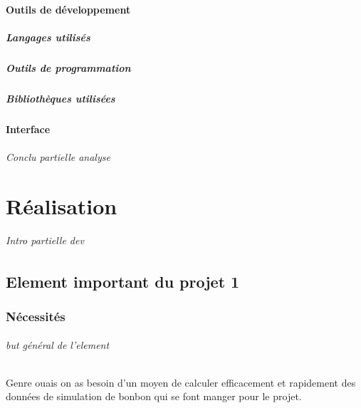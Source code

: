 \documentclass[
	headsepline=on,
	footsepline=on,
	twoside=off,
	abstract=on,
	DIV=10
]{scrreprt}
\begin{document}
			\subsection{Outils de développement}
			
				\subsubsection{Langages utilisés}
				
				\subsubsection{Outils de programmation}
				
				\subsubsection{Bibliothèques utilisées}
				
			\subsection{Interface}
		
		\paragraph{Conclu partielle analyse}
			
	\part{Réalisation}
	
		\paragraph{Intro partielle dev}
		\chapter{Element important du projet 1}
		
			\section{Nécessités}
			
				\paragraph{but général de l'element}
				Genre ouais on as besoin d'un moyen de calculer efficacement et rapidement des données de simulation de bonbon qui se font manger pour le projet.
				 
\end{document}
